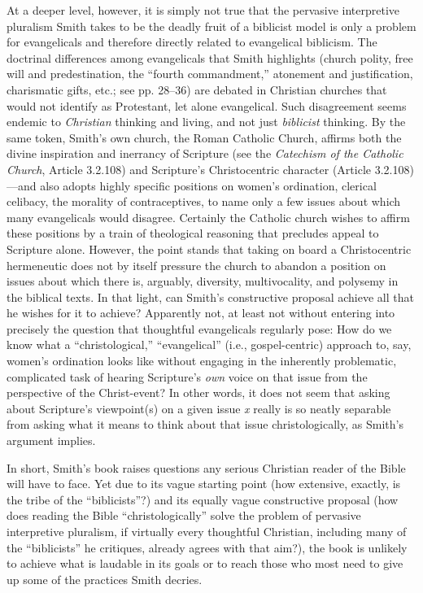 At a deeper level, however, it is simply not true that the pervasive interpretive pluralism Smith takes to be the deadly fruit of a biblicist model is only a problem for evangelicals and therefore directly related to evangelical biblicism. The doctrinal differences among evangelicals that Smith highlights (church polity, free will and predestination, the “fourth commandment,” atonement and justification, charismatic gifts, etc.; see pp. 28--36) are debated in Christian churches that would not identify as Protestant, let alone evangelical. Such disagreement seems endemic to \emph{Christian} thinking and living, and not just \emph{biblicist} thinking. By the same token, Smith’s own church, the Roman Catholic Church, affirms both the divine inspiration and inerrancy of Scripture (see the \emph{Catechism of the Catholic Church}, Article 3.2.108) and Scripture’s Christocentric character (Article 3.2.108)—and also adopts highly specific positions on women’s ordination, clerical celibacy, the morality of contraceptives, to name only a few issues about which many evangelicals would disagree. Certainly the Catholic church wishes to affirm these positions by a train of theological reasoning that precludes appeal to Scripture alone. However, the point stands that taking on board a Christocentric hermeneutic does not by itself pressure the church to abandon a position on issues about which there is, arguably, diversity, multivocality, and polysemy in the biblical texts. In that light, can Smith’s constructive proposal achieve all that he wishes for it to achieve? Apparently not, at least not without entering into precisely the question that thoughtful evangelicals regularly pose: How do we know what a “christological,” “evangelical” (i.e., gospel-centric) approach to, say, women’s ordination looks like without engaging in the inherently problematic, complicated task of hearing Scripture’s \emph{own} voice on that issue from the perspective of the Christ-event? In other words, it does not seem that asking about Scripture’s viewpoint(s) on a given issue \emph{x} really is so neatly separable from asking what it means to think about that issue christologically, as Smith’s argument implies.

In short, Smith’s book raises questions any serious Christian reader of the Bible will have to face. Yet due to its vague starting point (how extensive, exactly, is the tribe of the “biblicists”?) and its equally vague constructive proposal (how does reading the Bible “christologically” solve the problem of pervasive interpretive pluralism, if virtually every thoughtful Christian, including many of the “biblicists” he critiques, already agrees with that aim?), the book is unlikely to achieve what is laudable in its goals or to reach those who most need to give up some of the practices Smith decries.

